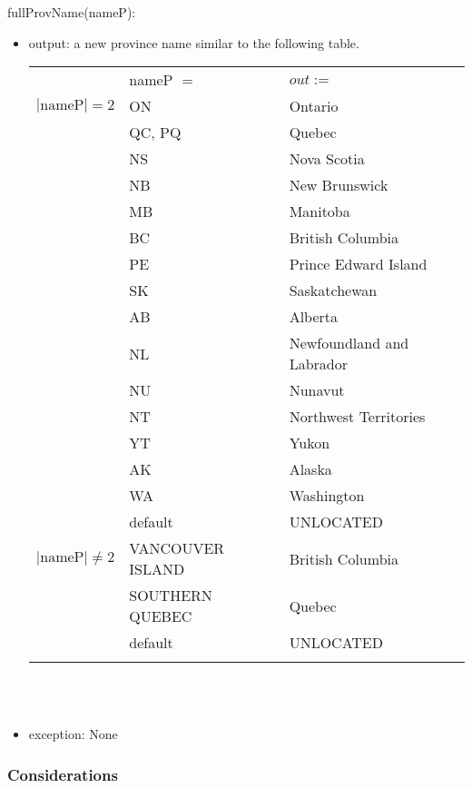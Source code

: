 \documentclass[12pt]{article}
\begin{document}
\noindent fullProvName(nameP):
\begin{itemize}
\item output: a new province name similar to the following table.

\begin{tabular}{|p{3cm}|p{3.5cm}|l|}
\hhline{~|-|-|}
\multicolumn{1}{l|}{} & nameP $=$ & \multicolumn{1}{l|}{$out :=$}\\
\hhline{|-|-|-|}
$|\mbox{nameP}| = 2$ & ON & Ontario\\
\hhline{|~|-|-|}
 & QC, PQ & Quebec\\
\hhline{|~|-|-|}
 & NS & Nova Scotia\\
\hhline{|~|-|-|}
 & NB & New Brunswick\\
\hhline{|~|-|-|}
 & MB & Manitoba\\
\hhline{|~|-|-|}
 & BC & British Columbia\\
\hhline{|~|-|-|}
 & PE & Prince Edward Island\\
\hhline{|~|-|-|}
 & SK & Saskatchewan\\
\hhline{|~|-|-|}
 & AB & Alberta\\
\hhline{|~|-|-|}
 & NL & Newfoundland and Labrador\\
\hhline{|~|-|-|}
 & NU & Nunavut\\
\hhline{|~|-|-|}
 & NT & Northwest Territories\\
\hhline{|~|-|-|}
 & YT & Yukon\\
\hhline{|~|-|-|}
 & AK & Alaska\\
\hhline{|~|-|-|}
 & WA & Washington\\
\hhline{|~|-|-|}
 & default & UNLOCATED\\
\hhline{|-|-|-|}
$|\mbox{nameP}| \neq 2$ & VANCOUVER ISLAND & British Columbia\\
\hhline{|~|-|-|}
& SOUTHERN QUEBEC & Quebec\\
\hhline{|~|-|-|}
& default & UNLOCATED\\
\hhline{|-|-|-|}
\end{tabular}\\\\

\item exception: None
\end{itemize}

\subsubsection* {Considerations}
\end{document}
